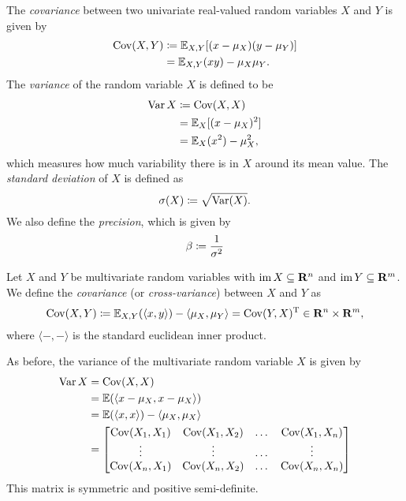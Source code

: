 \begin{definition}
\label{def:covariance-univariate}
The \emph{covariance} between two univariate real-valued random variables \(X\)
and \(Y\) is given by
\begin{align*}
  \operatorname{Cov}(X, Y)
  &\coloneq \operatorname{\mathbb{E}}_{X, Y}[(x - \mu_X)(y - \mu_Y)] \\
  &= \operatorname{\mathbb{E}}_{X, Y}(x y) - \mu_X \mu_Y.
\end{align*}
The \emph{variance} of the random variable \(X\) is defined to be
\begin{align*}
\operatorname{Var} X
&\coloneq \operatorname{Cov}(X, X) \\
&= \operatorname{\mathbb{E}}_X[(x - \mu_X)^2] \\
&= \operatorname{\mathbb{E}}_X(x^2) - \mu_X^2,
\end{align*}
which measures how much variability there is in \(X\) around its mean value.
The \emph{standard deviation} of \(X\) is defined as
\[
\operatorname{\sigma}(X) \coloneq \sqrt{\operatorname{Var}(X)}.
\]
We also define the \emph{precision}, which is given by
\[
\operatorname{\beta} \coloneq \frac{1}{\operatorname{\sigma}^2}
\]
\end{definition}

\begin{definition}
\label{def:covariance-multivariate}
Let \(X\) and \(Y\) be multivariate random variables with \(\operatorname{im} X \subseteq
\mathbf{R}^n\) and \(\operatorname{im} Y \subseteq \mathbf{R}^m\). We define the \emph{covariance} (or \emph{cross-variance}) between
\(X\) and \(Y\) as
\[
\operatorname{Cov}(X, Y) \coloneq \operatorname{\mathbb{E}}_{X, Y}(\langle x, y \rangle) -
\langle \mu_X , \mu_Y  \rangle
= \operatorname{Cov}(Y, X)^{\operatorname{T}} \in \mathbf{R}^n \times \mathbf{R}^m,
\]
where \(\langle -, - \rangle\) is the standard euclidean inner product.

As before, the variance of the multivariate random variable \(X\) is given by
\begin{align*}
  \operatorname{Var} X
  &= \operatorname{Cov}(X, X) \\
  &= \operatorname{\mathbb{E}}(\langle x - \mu_X, x - \mu_X \rangle) \\
  &= \operatorname{\mathbb{E}}(\langle x, x \rangle) - \langle \mu_X, \mu_X \rangle \\
  &=
    \begin{bmatrix}
      \operatorname{Cov}(X_1, X_1) &\operatorname{Cov}(X_1, X_2) &\dots &\operatorname{Cov}(X_1, X_n) \\
      \vdots &\vdots &\dots &\vdots \\
      \operatorname{Cov}(X_n, X_1) &\operatorname{Cov}(X_n, X_2) &\dots &\operatorname{Cov}(X_n, X_n) \\
    \end{bmatrix}
\end{align*}
This matrix is symmetric and positive semi-definite.
\end{definition}

